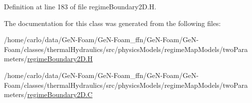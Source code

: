 Definition at line 183 of file regime\+Boundary2\+D.\+H.



The documentation for this class was generated from the following files\+:\begin{DoxyCompactItemize}
\item 
/home/carlo/data/\+Ge\+N-\/\+Foam/\+Ge\+N-\/\+Foam\+\_\+ffn/\+Ge\+N-\/\+Foam/\+Ge\+N-\/\+Foam/classes/thermal\+Hydraulics/src/physics\+Models/regime\+Map\+Models/two\+Parameters/\hyperlink{regimeBoundary2D_8H}{regime\+Boundary2\+D.\+H}\item 
/home/carlo/data/\+Ge\+N-\/\+Foam/\+Ge\+N-\/\+Foam\+\_\+ffn/\+Ge\+N-\/\+Foam/\+Ge\+N-\/\+Foam/classes/thermal\+Hydraulics/src/physics\+Models/regime\+Map\+Models/two\+Parameters/\hyperlink{regimeBoundary2D_8C}{regime\+Boundary2\+D.\+C}\end{DoxyCompactItemize}
